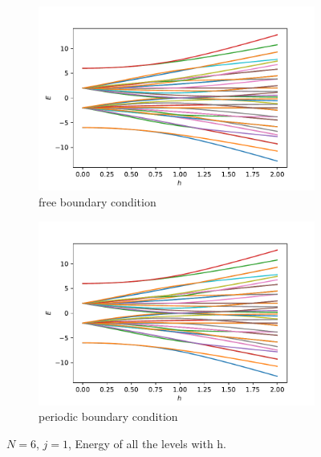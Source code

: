 \documentclass[a4paper]{extarticle}
\begin{document}
\begin{figure}[h!]
  \begin{subfigure}[h]{0.95\textwidth}
        \includegraphics[height=.73\linewidth]{../plots/pl_is_all_E_fbc}
        \caption{free boundary condition}
        \label{fig:fbc}
    \end{subfigure}
  \begin{subfigure}[h]{0.95\textwidth}
        \includegraphics[height=.73\linewidth]{../plots/pl_is_all_E}
        \caption{periodic boundary condition}
        \label{fig:pbc}
    \end{subfigure}
    \caption[Energy of all the levels with h.]{$N=6$, $j=1$, Energy of all the levels with h.}
    \label{fig:Evsh}
\end{figure}
\end{document}
